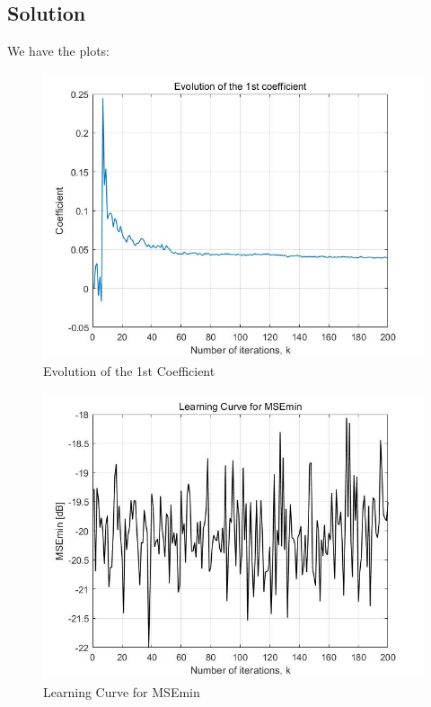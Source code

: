 \documentclass[UTF-8, a4paper, 12pt]{ctexart}
\begin{document}
\subsection{Solution}
We have the plots:
\begin{figure}[htbp]
    \centering
    \includegraphics[width=13cm]{4.13/f1.jpg}
    \caption{Evolution of the 1st Coefficient}
\end{figure}



\begin{figure}[htbp]
    \centering
    \includegraphics[width=13cm]{4.13/f2.jpg}
    \caption{Learning Curve for MSEmin}
\end{figure}
\end{document}

